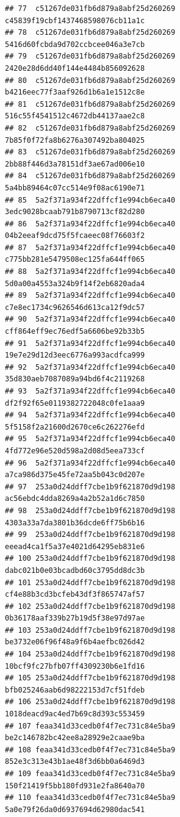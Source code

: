 \documentclass[]{article}
\begin{document}
\begin{verbatim}
## 77  c51267de031fb6d879a8abf25d260269     c45839f19cbf1437468598076cb11a1c
## 78  c51267de031fb6d879a8abf25d260269     5416d60fcbda9d702ccbcee046a3e7cb
## 79  c51267de031fb6d879a8abf25d260269     2420e28d6dd40f144e4484b856092628
## 80  c51267de031fb6d879a8abf25d260269     b4216eec77f3aaf926d1b6a1e1512c8e
## 81  c51267de031fb6d879a8abf25d260269     516c55f4541512c4672db44137aae2c8
## 82  c51267de031fb6d879a8abf25d260269     7b85f0f72fa8b6276a307492ba804025
## 83  c51267de031fb6d879a8abf25d260269     2bb88f446d3a78151df3ae67ad006e10
## 84  c51267de031fb6d879a8abf25d260269     5a4bb89464c07cc514e9f08ac6190e71
## 85  5a2f371a934f22dffcf1e994cb6eca40     3edc9028bcaab791b8790713cf82d280
## 86  5a2f371a934f22dffcf1e994cb6eca40     04b2eeaf9dcd75f5fcaeec08f76603f2
## 87  5a2f371a934f22dffcf1e994cb6eca40     c775bb281e5479508ec125fa644ff065
## 88  5a2f371a934f22dffcf1e994cb6eca40     5d0a00a4553a324b9f14f2eb6820ada4
## 89  5a2f371a934f22dffcf1e994cb6eca40     c7e8ec1734c9626546d613ca12f9dc57
## 90  5a2f371a934f22dffcf1e994cb6eca40     cff864eff9ec76edf5a6606be92b33b5
## 91  5a2f371a934f22dffcf1e994cb6eca40     19e7e29d12d3eec6776a993acdfca999
## 92  5a2f371a934f22dffcf1e994cb6eca40     35d830aeb7087089a94bd6f4c2119268
## 93  5a2f371a934f22dffcf1e994cb6eca40     df2f92f65e0119382722048c0fe1aaa9
## 94  5a2f371a934f22dffcf1e994cb6eca40     5f5158f2a21600d2670ce6c262276efd
## 95  5a2f371a934f22dffcf1e994cb6eca40     4fd772e96e520d598a2d08d5eea733cf
## 96  5a2f371a934f22dffcf1e994cb6eca40     a7ca986d375e45fe72aa5b043c0d207e
## 97  253a0d24ddff7cbe1b9f621870d9d198     ac56ebdc4dda8269a4a2b52a1d6c7850
## 98  253a0d24ddff7cbe1b9f621870d9d198     4303a33a7da3801b36dcde6ff75b6b16
## 99  253a0d24ddff7cbe1b9f621870d9d198     eeead4ca1f5a37e4021d64295eb831e6
## 100 253a0d24ddff7cbe1b9f621870d9d198     dabc021b0e03bcadbd60c3795dd8dc3b
## 101 253a0d24ddff7cbe1b9f621870d9d198     cf4e88b3cd3bcfeb43df3f865747af57
## 102 253a0d24ddff7cbe1b9f621870d9d198     0b36178aaf339b27b19d5f38e97d97ae
## 103 253a0d24ddff7cbe1b9f621870d9d198     be3732e06f96f48a9f6b4aefbc026d42
## 104 253a0d24ddff7cbe1b9f621870d9d198     10bcf9fc27bfb07ff4309230b6e1fd16
## 105 253a0d24ddff7cbe1b9f621870d9d198     bfb025246aab6d98222153d7cf51fdeb
## 106 253a0d24ddff7cbe1b9f621870d9d198     1018deacd9ac4ed7b69c8d393c553459
## 107 feaa341d33cedb0f4f7ec731c84e5ba9     be2c146782bc42ee8a28929e2caae9ba
## 108 feaa341d33cedb0f4f7ec731c84e5ba9     852e3c313e43b1ae48f3d6bb0a6469d3
## 109 feaa341d33cedb0f4f7ec731c84e5ba9     150f21419f5bb180fd931e2fa8640a70
## 110 feaa341d33cedb0f4f7ec731c84e5ba9     5a0e79f26da0d6937694d62980dac541

\end{verbatim}
\end{document}
